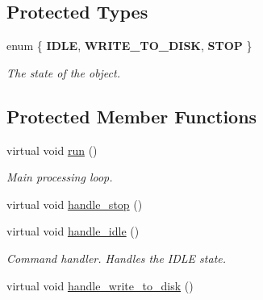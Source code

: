 \subsection*{Protected Types}
\begin{DoxyCompactItemize}
\item 
enum \{ {\bfseries IDLE}, 
{\bfseries WRITE\_\-TO\_\-DISK}, 
{\bfseries STOP}
 \}
\begin{DoxyCompactList}\small\item\em The state of the object. \end{DoxyCompactList}\end{DoxyCompactItemize}
\subsection*{Protected Member Functions}
\begin{DoxyCompactItemize}
\item 
\hypertarget{class_stats_writer_adae8b6f9a5172be2f18d2cbdcb1700b0}{
virtual void \hyperlink{class_stats_writer_adae8b6f9a5172be2f18d2cbdcb1700b0}{run} ()}
\label{class_stats_writer_adae8b6f9a5172be2f18d2cbdcb1700b0}

\begin{DoxyCompactList}\small\item\em Main processing loop. \end{DoxyCompactList}\item 
virtual void \hyperlink{class_stats_writer_aa3fbb751b426a75bb161a52f06d74803}{handle\_\-stop} ()
\item 
\hypertarget{class_stats_writer_a51a3ee2b174b8ffc227d5bbbcf71c1d1}{
virtual void \hyperlink{class_stats_writer_a51a3ee2b174b8ffc227d5bbbcf71c1d1}{handle\_\-idle} ()}
\label{class_stats_writer_a51a3ee2b174b8ffc227d5bbbcf71c1d1}

\begin{DoxyCompactList}\small\item\em Command handler. Handles the IDLE state. \end{DoxyCompactList}\item 
virtual void \hyperlink{class_stats_writer_a7d25c32ff0f971c9bf04f595eb70c9a0}{handle\_\-write\_\-to\_\-disk} ()
\end{DoxyCompactItemize}
